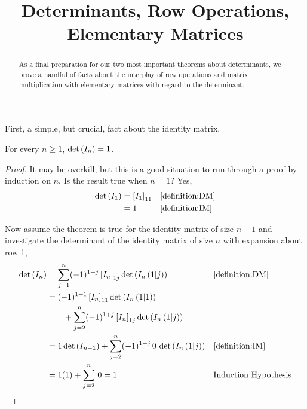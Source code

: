 \documentclass{ximera}
\title{Determinants, Row Operations, Elementary Matrices}
\begin{document}
\begin{abstract}
  As a final preparation for our two most important theorems about
  determinants, we prove a handful of facts about the interplay of row
  operations and matrix multiplication with elementary matrices with
  regard to the determinant.
\end{abstract}
\maketitle

First, a simple, but crucial, fact about the identity matrix.

\begin{theorem}
  \label{theorem:DIM} 

  For every $n\geq 1$, $\det\left(I_n\right)=1$.

  \begin{proof}
    It may be overkill, but this is a good situation to run through a
    proof by induction on $n$.  Is the result true when $n=1$? Yes,
    \begin{align*}
      \det\left(I_1\right)
      &=\left\lbrack I_1\right\rbrack_{11}&&\ref{definition:DM}\\
      &=1&&\ref{definition:IM}\\
    \end{align*}
    
    Now assume the theorem is true for the identity matrix of size
    $n-1$ and investigate the determinant of the identity matrix of
    size $n$ with expansion about row 1,
    \begin{align*}
      \det\left(I_n\right)
      &=
        \sum_{j=1}^{n}(-1)^{1+j}\left\lbrack I_n\right\rbrack_{1j}\det\left(I_n\left(1|j\right)\right)
      &&\ref{definition:DM}\\
      &=
        (-1)^{1+1}\left\lbrack I_n\right\rbrack_{11}\det\left(I_n\left(1|1\right)\right)\\
      &\quad\quad+
        \sum_{j=2}^{n}(-1)^{1+j}\left\lbrack I_n\right\rbrack_{1j}\det\left(I_n\left(1|j\right)\right)\\
      &=
        1\det\left(I_{n-1}\right)+
        \sum_{j=2}^{n}(-1)^{1+j}\,0\,\det\left(I_n\left(1|j\right)\right)
      &&\ref{definition:IM}\\
      &=
        1(1)+\sum_{j=2}^{n}\,0=1
      &&\text{Induction Hypothesis}\\
    \end{align*}
  \end{proof}
\end{theorem}
\end{document}
